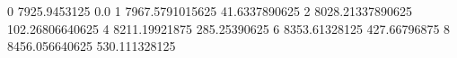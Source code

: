 0 7925.9453125 0.0
1 7967.5791015625 41.6337890625
2 8028.21337890625 102.26806640625
4 8211.19921875 285.25390625
6 8353.61328125 427.66796875
8 8456.056640625 530.111328125
